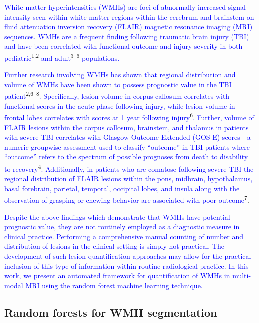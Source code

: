 \documentclass[11pt,]{article}
\begin{document}
\textcolor{blue}{White matter hyperintensities (WMHs) are foci of abnormally increased signal intensity seen within white matter regions within the cerebrum and brainstem on fluid attenuation inversion recovery (FLAIR) magnetic resonance imaging (MRI) sequences.
WMHs are a frequent finding following traumatic brain injury (TBI) and have been correlated with functional outcome and injury severity in both pediatric}\textsuperscript{1,2}
\textcolor{blue}{and adult}\textsuperscript{3--6}
\textcolor{blue}{populations.}

\textcolor{blue}{Further research involving WMHs has shown that regional distribution and volume of WMHs have been shown to possess prognostic value in the TBI patient}\textsuperscript{2,6--8}\textcolor{blue}{. Specifically, lesion volume in corpus callosum correlates with functional scores in the acute phase following injury, while lesion volume in frontal lobes correlates with scores at 1 year following injury}\textsuperscript{6}\textcolor{blue}{.
Further, volume of FLAIR lesions within the corpus
callosum, brainstem, and thalamus in patients with severe TBI correlates
with Glasgow Outcome-Extended (GOS-E) scores---a numeric groupwise assessment used to
classify ``outcome'' in TBI patients where ``outcome'' refers to the
spectrum of possible prognoses from death to disability to recovery}\textsuperscript{4}\textcolor{blue}{. Additionally,
in patients who are comatose following severe TBI
the regional distribution of FLAIR lesions within the pons, midbrain, hypothalamus, basal forebrain, parietal, temporal, occipital lobes, and insula along with the observation of grasping or chewing behavior are associated with poor outcome}\textsuperscript{7}.

\textcolor{blue}{Despite the above findings which demonstrate that WMHs have potential prognostic value, they are not routinely employed as a diagnostic measure in clinical practice.  Performing a comprehensive manual counting of number and distribution of lesions in the clinical setting is simply not practical. The development of such lesion quantification approaches may allow for the practical inclusion of this type of information within routine radiological practice.  In this work, we present an automated framework for quantification of WMHs in
multi-modal MRI using the random forest machine learning technique.}

\subsection{Random forests for WMH
segmentation}\label{random-forests-for-wmh-segmentation}
\end{document}
